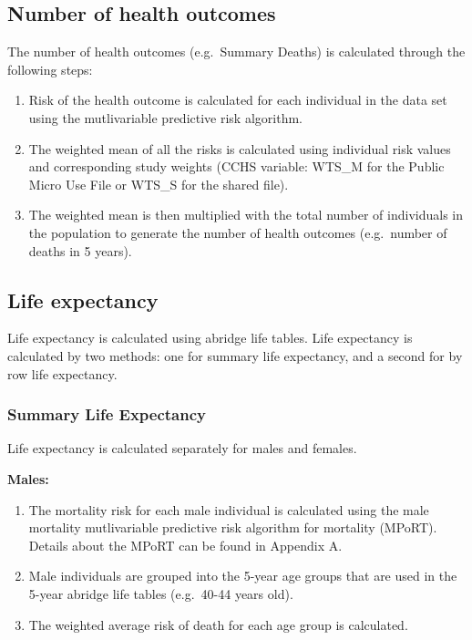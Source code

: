 \documentclass[]{book}
\providecommand{\tightlist}{%
  \setlength{\itemsep}{0pt}\setlength{\parskip}{0pt}}
\begin{document}
\subsection{Number of health outcomes}\label{number-of-health-outcomes}

The number of health outcomes (e.g.~Summary Deaths) is calculated
through the following steps:

\begin{enumerate}
\def\labelenumi{\arabic{enumi}.}
\tightlist
\item
  Risk of the health outcome is calculated for each individual in the
  data set using the mutlivariable predictive risk algorithm.
\item
  The weighted mean of all the risks is calculated using individual risk
  values and corresponding study weights (CCHS variable: WTS\_M for the
  Public Micro Use File or WTS\_S for the shared file).
\item
  The weighted mean is then multiplied with the total number of
  individuals in the population to generate the number of health
  outcomes (e.g.~number of deaths in 5 years).
\end{enumerate}

\subsection{Life expectancy}\label{life-expectancy}

Life expectancy is calculated using abridge life tables. Life expectancy
is calculated by two methods: one for summary life expectancy, and a
second for by row life expectancy.

\subsubsection{Summary Life Expectancy}\label{summary-life-expectancy}

Life expectancy is calculated separately for males and females.

\textbf{Males:}

\begin{enumerate}
\def\labelenumi{\arabic{enumi}.}
\item
  The mortality risk for each male individual is calculated using the
  male mortality mutlivariable predictive risk algorithm for mortality
  (MPoRT). Details about the MPoRT can be found in Appendix A.
\item
  Male individuals are grouped into the 5-year age groups that are used
  in the 5-year abridge life tables (e.g.~40-44 years old).
\item
  The weighted average risk of death for each age group is calculated.
\end{enumerate}
\end{document}

